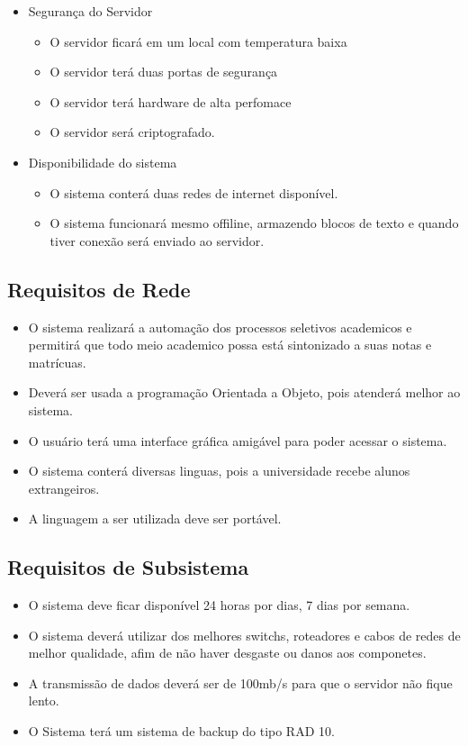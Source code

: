 \begin{itemize}
     \item Segurança do Servidor
      \begin{itemize}
       \item O servidor ficará em um local com temperatura baixa
       \item O servidor terá duas portas de segurança
       \item O servidor terá hardware de alta perfomace
       \item O servidor será criptografado.
      \end{itemize}

     
     \item Disponibilidade do sistema
        \begin{itemize}
         \item O sistema conterá duas redes de internet disponível.
         \item O sistema funcionará mesmo offiline, armazendo blocos de texto e quando tiver conexão será enviado ao servidor.
        \end{itemize}


   \end{itemize}

   \subsection{Requisitos de Rede}
     \begin{itemize}
      \item O sistema realizará a automação dos processos seletivos academicos e permitirá que todo meio academico possa está sintonizado a suas notas e matrícuas.
      \item Deverá ser usada a programação Orientada a Objeto, pois atenderá melhor ao sistema.
      \item O usuário terá uma interface gráfica amigável para poder acessar o sistema.
      \item O sistema conterá diversas linguas, pois a universidade recebe alunos extrangeiros.
      \item A linguagem a ser utilizada deve ser portável.
     \end{itemize}
     
     \subsection{Requisitos de Subsistema}
      \begin{itemize}
       \item  O sistema deve ficar disponível 24 horas por dias, 7 dias por semana.
       \item  O sistema deverá utilizar dos melhores switchs, roteadores e cabos de redes de melhor qualidade, afim de não haver desgaste ou danos aos componetes.
       \item  A transmissão de dados deverá ser de 100mb/s para que o servidor não fique lento.
       \item O Sistema terá um sistema de backup do tipo RAD 10.
      \end{itemize}

